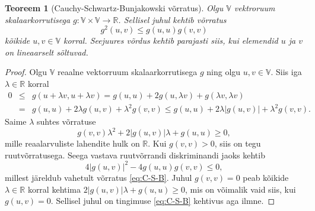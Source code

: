 \documentclass[a4paper,12pt]{article}
\newtheorem{teoreem}{Teoreem}[section]
\numberwithin{equation}{section}
\begin{document}
\begin{appendices}
\begin{teoreem}[Cauchy-Schwartz-Bunjakowski võrratus]
Olgu $\mathbb{V}$ vektroruum skalaarkorrutisega $g : \mathbb{V} \times \mathbb{V} \rightarrow \mathbb{R}$. Sellisel juhul kehtib võrratus
\begin{equation} \label{eq:C-S-B}
g^2 \left(u, v \right) \leq g \left(u, u \right) g \left(v, v \right)
\end{equation}
kõikide $u, v \in \mathbb{V}$ korral. Seejuures võrdus kehtib parajasti siis, kui elemendid $u$ ja $v$ on lineaarselt sõltuvad.
\end{teoreem}

%
%
\begin{proof}
Olgu $\mathbb{V}$ reaalne vektorruum skalaarkorrutisega $g$ ning olgu $u, v \in \mathbb{V}$. Siis iga $\lambda \in \mathbb{R}$ korral
\begin{eqnarray*}
0 &\leq& g\left(u+\lambda v,u+\lambda v\right) = g\left(u,u\right) + 2g\left(u, \lambda v \right) + g\left(\lambda v, \lambda v\right) \\
&=& g\left(u,u\right) + 2\lambda g\left(u, v \right) + \lambda^2 g\left(v,v\right) \leq g\left(u,u\right) + 2\lambda | g\left(u, v \right)| + \lambda^2 g\left(v,v\right).
\end{eqnarray*}
Saime $\lambda$ suhtes võrratuse
\begin{equation*}
g\left(v,v\right)\lambda^2 + 2|g\left(u, v \right)|\lambda + g\left(u,u\right) \geq 0,
\end{equation*}
mille reaalarvuliste lahendite hulk on $\mathbb{R}$. Kui $g\left(v,v\right) > 0$, siis on tegu ruut\-võrratusega. Seega vastava ruutvõrrandi diskriminandi jaoks kehtib
\begin{equation*}
4|g\left(u,v\right)|^2 - 4g\left(u,u\right)g\left(v,v\right) \leq 0,
\end{equation*}
millest järeldub vahetult võrratus \ref{eq:C-S-B}. Juhul $g\left(v,v\right) = 0$ peab kõikide $\lambda \in \mathbb{R}$ korral kehtima $2|g\left(u,v\right)|\lambda + g\left(u,u\right) \geq 0$, mis on võimalik vaid siis, kui $g\left(u,v\right) = 0$. Sellisel juhul on tingimuse \ref{eq:C-S-B} kehtivus aga ilmne.

\end{proof}
\end{appendices}
\end{document}
